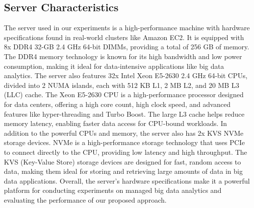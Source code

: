 \subsection{Server Characteristics}
The server used in our experiments is a high-performance machine with
hardware specifications found in real-world clusters like Amazon EC2.
It is equipped with 8x DDR4 32-GB 2.4 GHz 64-bit DIMMs, providing a
total of 256 GB of memory. The DDR4 memory technology is known for its
high bandwidth and low power consumption, making it ideal for
data-intensive applications like big data analytics. The server also
features 32x Intel Xeon E5-2630 2.4 GHz 64-bit CPUs, divided into 2
NUMA islands, each with 512 KB L1, 2 MB L2, and 20 MB L3 (LLC) cache.
The Xeon E5-2630 CPU is a high-performance processor designed for data
centers, offering a high core count, high clock speed, and advanced
features like hyper-threading and Turbo Boost. The large L3 cache
helps reduce memory latency, enabling faster data access for CPU-bound
workloads. In addition to the powerful CPUs and memory, the server
also has 2x KVS NVMe storage devices. NVMe is a high-performance
storage technology that uses PCIe to connect directly to the CPU,
providing low latency and high throughput. The KVS (Key-Value Store)
storage devices are designed for fast, random access to data, making
them ideal for storing and retrieving large amounts of data in big
data applications. Overall, the server's hardware specifications make
it a powerful platform for conducting experiments on managed big data
analytics and evaluating the performance of our proposed approach. 

